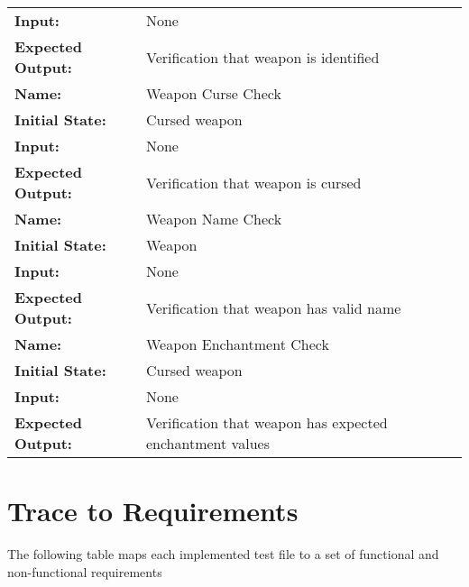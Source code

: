 \documentclass[12pt, titlepage]{article}
\newcommand{\newsection}[1]{
  \newpage
  \section{#1}
}
\begin{document}
\begin{center}
\begin{longtable}{ l | p{10cm} }
				\textbf{Input:} & None\\
				\textbf{Expected Output:} & Verification that weapon is identified\\[1em]
				\hline
				\rule{0pt}{2em}\textbf{Name:} & Weapon Curse Check\\
				\textbf{Initial State:} & Cursed weapon\\
				\textbf{Input:} & None\\
				\textbf{Expected Output:} & Verification that weapon is cursed\\[1em]
				\hline
				\rule{0pt}{2em}\textbf{Name:} & Weapon Name Check\\
				\textbf{Initial State:} & Weapon\\
				\textbf{Input:} & None\\
				\textbf{Expected Output:} & Verification that weapon has valid name\\[1em]
				\hline
				\rule{0pt}{2em}\textbf{Name:} & Weapon Enchantment Check\\
				\textbf{Initial State:} & Cursed weapon\\
				\textbf{Input:} & None\\
				\textbf{Expected Output:} & Verification that weapon has expected enchantment values\\[1em]
				\hline

			\end{longtable}

		\end{center}

\newsection{Trace to Requirements} \label{Section_R_Trace}

	The following table maps each implemented test file to a set of functional and non-functional requirements 
\end{document}
